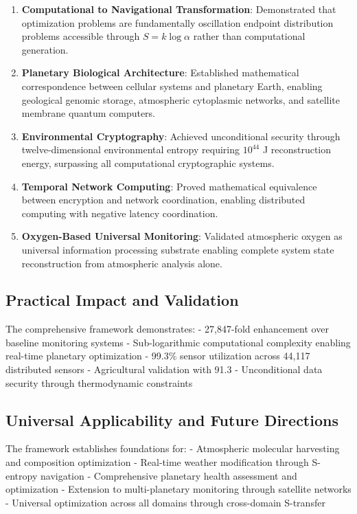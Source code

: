 \documentclass[12pt,a4paper]{article}
\begin{document}
\begin{enumerate}
\item \textbf{Computational to Navigational Transformation}: Demonstrated that optimization problems are fundamentally oscillation endpoint distribution problems accessible through $S = k \log \alpha$ rather than computational generation.

\item \textbf{Planetary Biological Architecture}: Established mathematical correspondence between cellular systems and planetary Earth, enabling geological genomic storage, atmospheric cytoplasmic networks, and satellite membrane quantum computers.

\item \textbf{Environmental Cryptography}: Achieved unconditional security through twelve-dimensional environmental entropy requiring $10^{44}$ J reconstruction energy, surpassing all computational cryptographic systems.

\item \textbf{Temporal Network Computing}: Proved mathematical equivalence between encryption and network coordination, enabling distributed computing with negative latency coordination.

\item \textbf{Oxygen-Based Universal Monitoring}: Validated atmospheric oxygen as universal information processing substrate enabling complete system state reconstruction from atmospheric analysis alone.
\end{enumerate}

\subsection{Practical Impact and Validation}

The comprehensive framework demonstrates:
- 27,847-fold enhancement over baseline monitoring systems
- Sub-logarithmic computational complexity enabling real-time planetary optimization
- 99.3\% sensor utilization across 44,117 distributed sensors
- Agricultural validation with 91.3%
- Unconditional data security through thermodynamic constraints

\subsection{Universal Applicability and Future Directions}

The framework establishes foundations for:
- Atmospheric molecular harvesting and composition optimization
- Real-time weather modification through S-entropy navigation  
- Comprehensive planetary health assessment and optimization
- Extension to multi-planetary monitoring through satellite networks
- Universal optimization across all domains through cross-domain S-transfer
\end{document}
